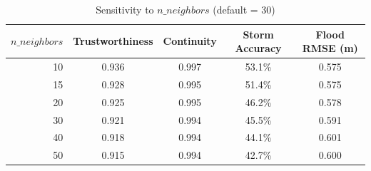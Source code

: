 \begin{table}[H]
\centering
\begin{tabular}{rcccc}
    \toprule
    $n\_neighbors$ & Trustworthiness & Continuity & Storm Accuracy & Flood RMSE (m) \\
    \midrule
    10 & 0.936 & 0.997 & 53.1\% & 0.575 \\
    15 & 0.928 & 0.995 & 51.4\% & 0.575 \\
    20 & 0.925 & 0.995 & 46.2\% & 0.578 \\
    30 & 0.921 & 0.994 & 45.5\% & 0.591 \\
    40 & 0.918 & 0.994 & 44.1\% & 0.601 \\
    50 & 0.915 & 0.994 & 42.7\% & 0.600 \\
    \bottomrule
\end{tabular}
\caption{Sensitivity to $n\_neighbors$ (default = 30)}
\label{tab:sens_neighbors}
\end{table}